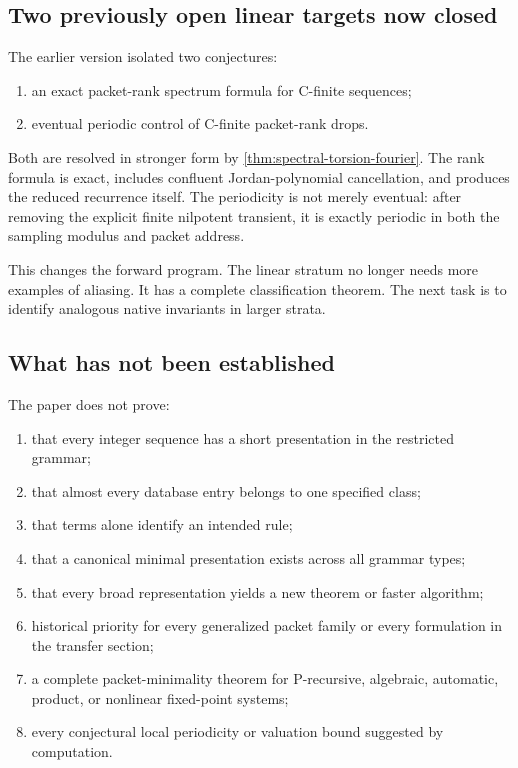 \documentclass[11pt]{article}
\theoremstyle{definition}\newtheorem{definition}[theorem]{Definition}\newtheorem{example}[theorem]{Example}\newtheorem{construction}[theorem]{Construction}\newtheorem{algorithm}[theorem]{Algorithm}\newtheorem{conjecture}[theorem]{Conjecture}\newtheorem{problem}[theorem]{Problem}
\theoremstyle{remark}\newtheorem{remark}[theorem]{Remark}\newtheorem{boundary}[theorem]{Boundary}\newtheorem{certificate}[theorem]{Computational Certificate}\newtheorem{classical}[theorem]{Classical Input}\newtheorem{principle}[theorem]{Structural Principle}
\begin{document}
\subsection{Two previously open linear targets now closed}
The earlier version isolated two conjectures:
\begin{enumerate}
\item an exact packet-rank spectrum formula for C-finite sequences;
\item eventual periodic control of C-finite packet-rank drops.
\end{enumerate}
Both are resolved in stronger form by \cref{thm:spectral-torsion-fourier}.  The rank formula is exact, includes confluent Jordan-polynomial cancellation, and produces the reduced recurrence itself.  The periodicity is not merely eventual: after removing the explicit finite nilpotent transient, it is exactly periodic in both the sampling modulus and packet address.

This changes the forward program.  The linear stratum no longer needs more examples of aliasing.  It has a complete classification theorem.  The next task is to identify analogous native invariants in larger strata.

\subsection{What has not been established}
The paper does not prove:
\begin{enumerate}
\item that every integer sequence has a short presentation in the restricted grammar;
\item that almost every database entry belongs to one specified class;
\item that terms alone identify an intended rule;
\item that a canonical minimal presentation exists across all grammar types;
\item that every broad representation yields a new theorem or faster algorithm;
\item historical priority for every generalized packet family or every formulation in the transfer section;
\item a complete packet-minimality theorem for P-recursive, algebraic, automatic, product, or nonlinear fixed-point systems;
\item every conjectural local periodicity or valuation bound suggested by computation.
\end{enumerate}
\end{document}
